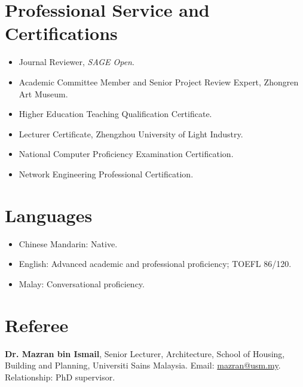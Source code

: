 \documentclass[11pt,a4paper]{article}
\begin{document}
\section*{Professional Service and Certifications}
\begin{itemize}
  \item Journal Reviewer, \textit{SAGE Open}.
  \item Academic Committee Member and Senior Project Review Expert, Zhongren Art Museum.
  \item Higher Education Teaching Qualification Certificate.
  \item Lecturer Certificate, Zhengzhou University of Light Industry.
  \item National Computer Proficiency Examination Certification.
  \item Network Engineering Professional Certification.
\end{itemize}

\section*{Languages}
\begin{itemize}
  \item Chinese Mandarin: Native.
  \item English: Advanced academic and professional proficiency; TOEFL 86/120.
  \item Malay: Conversational proficiency.
\end{itemize}

\section*{Referee}
\textbf{Dr. Mazran bin Ismail}, Senior Lecturer, Architecture, School of Housing, Building and Planning, Universiti Sains Malaysia. Email: \href{mailto:mazran@usm.my}{mazran@usm.my}. Relationship: PhD supervisor.
\end{document}
